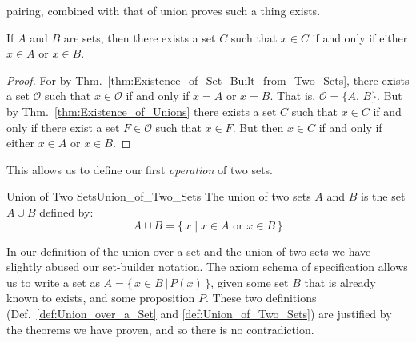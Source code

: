         pairing, combined with that of union proves
        such a thing exists.
        \begin{theorem}
            \label{thm:Union_of_Two_Sets_Exists}%
            If $A$ and $B$ are sets, then there exists a set $C$ such that
            $x\in{C}$ if and only if either $x\in{A}$ or $x\in{B}$.
        \end{theorem}
        \begin{proof}
            For by Thm.~\ref{thm:Existence_of_Set_Built_from_Two_Sets},
            there exists a set $\mathcal{O}$ such that $x\in\mathcal{O}$ if and
            only if $x=A$ or $x=B$. That is, $\mathcal{O}=\{A,\,B\}$.
            But by Thm.~\ref{thm:Existence_of_Unions} there exists a set
            $C$ such that $x\in{C}$ if and only if there exist a set
            $F\in\mathcal{O}$ such that $x\in{F}$. But then $x\in{C}$ if and
            only if either $x\in{A}$ or $x\in{B}$.
        \end{proof}
        This allows us to define our first \textit{operation} of two sets.
        \begin{fdefinition}{Union of Two Sets}{Union_of_Two_Sets}
            The \gls{union of two sets} $A$ and $B$ is the set $A\cup{B}$
            defined by:
            \begin{equation*}
                A\cup{B}=\big\{\,x\;|\;x\in{A}\textrm{ or }x\in{B}\,\big\}
            \end{equation*}
        \end{fdefinition}
        In our definition of the union over a set and the union of two sets
        we have slightly abused our set-builder notation. The axiom schema
        of specification allows us to write a set as
        $A=\{\,x\in{B}\,|\,P(x)\,\}$, given some set $B$ that is already known
        to exists, and some proposition $P$. These two definitions
        (Def.~\ref{def:Union_over_a_Set} and \ref{def:Union_of_Two_Sets})
        are justified by the theorems we have proven, and so there is no
        contradiction.
